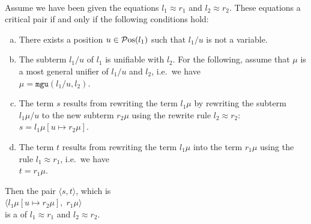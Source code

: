 \begin{Definition} \hspace*{\fill} \\
  Assume we have been given the equations $l_1 \approx r_1$ and $l_2 \approx r_2$.  These equations
   a critical pair if and only if the following conditions hold:
  \begin{enumerate}[(a)]
  \item There exists a position $u \in \mathcal{P}\mathrm{os}(l_1)$ such that $l_1/u$ is not a variable.
  \item The subterm $l_1/u$ of $l_1$ is unifiable with $l_2$.  For the following, assume that $\mu$ is a most general unifier
        of $l_1/u$ and $l_2$, i.e.~we have
        \\[0.2cm]
        \hspace*{1.3cm}
        $\mu = \texttt{mgu}(l_1/u, l_2)$.
  \item The term $s$ results from rewriting the term $l_1\mu$ by rewriting the subterm $l_1\mu/u$
        to the new subterm $r_2\mu$ using the rewrite rule $l_2 \approx r_2$:      
        \\[0.2cm]
        \hspace*{1.3cm}
        $s = l_1\mu[u \mapsto r_2\mu]$.
  \item The term $t$ results from rewriting the term $l_1\mu$ into the term $r_1\mu$ using the rule
        $l_1 \approx r_1$, i.e.~we have
        \\[0.2cm]
        \hspace*{1.3cm}
        $t = r_1\mu$.  
      \end{enumerate}
      Then the pair $\langle s, t \rangle$, which is
      \\[0.2cm]
      \hspace*{1.3cm}
      $\bigl\langle l_1\mu[u \mapsto r_2\mu],\; r_1\mu \bigr\rangle$
      \\[0.2cm]
      is a  of $l_1 \approx r_1$ and $l_2 \approx r_2$. \eod
\end{Definition}

